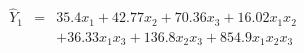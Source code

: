 

\[
\begin{array}{lll} \hat{Y}_{1} & = & 35.4x_1 + 42.77x_2 + 70.36x_3 + 16.02x_{1}x_{2} \\ & & + 36.33x_{1}x_{3} + 136.8x_{2}x_{3} + 854.9x_{1}x_{2}x_{3} \end{array}
\]


